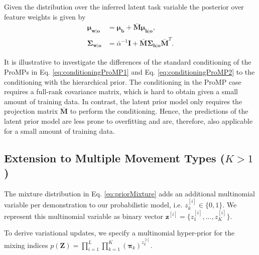 \documentclass[letterpaper, 10 pt, conference]{ieeeconf}  %
\renewcommand{\vec}[1]{\ensuremath{\boldsymbol{#1}}}
\newcommand{\Vwo}{\ensuremath{\vec \mu_{\vec b} }}
\newcommand{\VWV}{\ensuremath{\bar{\vec M} }}
\newcommand{\ValphaN}{\ensuremath{\bar{\alpha} }}
\begin{document}
Given the distribution over the inferred latent task variable  
the posterior over feature weights is given by 
\begin{align}
\boldsymbol{\mu}_{\vec w | \vec o} &= \Vwo + \VWV \boldsymbol{\mu}_{\vec h | \vec o}, \label{eq:post_w_single} \\
\boldsymbol{\Sigma}_{\vec w |\vec o} &= \ValphaN^{-1} \vec I + \VWV \boldsymbol{\Sigma}_{\vec h| \vec o} \VWV^T. \label{eq:post_single_sigma}
\end{align}

It is illustrative to investigate the differences of the standard conditioning of the ProMPs in Eq. \eqref{eq:conditioningProMP1} and Eq. \eqref{eq:conditioningProMP2} 
to the conditioning with the hierarchical prior. 
The conditioning in the ProMP case requires a full-rank covariance matrix, 
which is hard to obtain given a small amount of training data. 
In contrast, the latent prior model only requires the 
projection matrix $\VWV$ to perform the conditioning. 
Hence, the predictions of the latent prior model are less prone to overfitting and are, 
therefore, also applicable for a small amount of training data.

\subsection{Extension to Multiple Movement Types ($K>1$)}
\label{sec:mixmodel}

The mixture distribution in Eq. \eqref{eq:priorMixture} adds an additional multinomial variable per demonstration to our probabilistic model, 
i.e. $z^{[i]}_k \in \{0,1\}$. %
We represent this multinomial variable as binary vector $\mathbf{z}^{[i]} = \{z^{[i]}_1,...,z^{[i]}_K\}$. 

To derive variational updates, we specify a multinomial hyper-prior for the mixing indices 
$p(\vec Z) = \prod_{i=1}^L \prod_{k=1}^K (\vec \pi_k)^{z^{[i]}_k}$.
\end{document}
